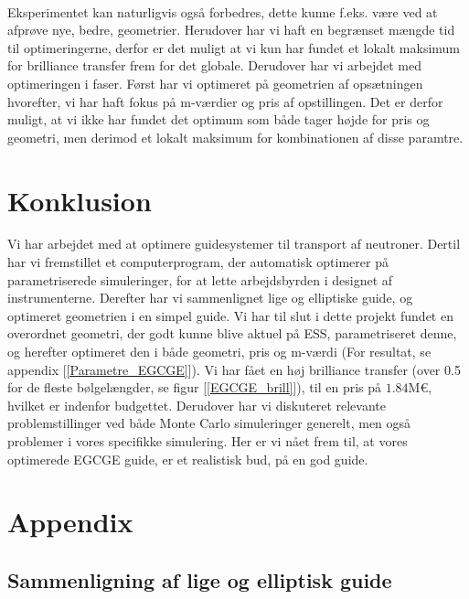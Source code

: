 \documentclass[12pt,oneside,a4paper]{article}
\begin{document}
{{{{{\\
Eksperimentet kan naturligvis også forbedres, dette kunne f.eks. være ved at afprøve nye, bedre, geometrier. Herudover har vi haft en begrænset mængde tid til optimeringerne, derfor er det muligt at vi kun har fundet et lokalt maksimum for brilliance transfer frem for det globale. Derudover har vi arbejdet med optimeringen i faser. Først har vi optimeret på geometrien af opsætningen hvorefter, vi har haft fokus på m-værdier og pris af opstillingen. Det er derfor muligt, at vi ikke har fundet det optimum som både tager højde for pris og geometri, men derimod et lokalt maksimum for kombinationen af disse paramtre.

\section{Konklusion}
Vi har arbejdet med at optimere guidesystemer til transport af neutroner. Dertil har vi fremstillet et computerprogram, der automatisk optimerer på parametriserede simuleringer, for at lette arbejdsbyrden i designet af instrumenterne. Derefter har vi sammenlignet lige og elliptiske guide, og optimeret geometrien i en simpel guide. Vi har til slut i dette projekt fundet en overordnet geometri, der godt kunne blive aktuel på ESS, parametriseret denne, og herefter optimeret den i både geometri, pris og m-værdi (For resultat, se appendix [\ref{Parametre_EGCGE}]). Vi har fået en høj brilliance transfer (over 0.5 for de fleste bølgelængder, se figur [\ref{EGCGE_brill}]), til en pris på $1.84\text{M€}$, hvilket er indenfor budgettet. Derudover har vi diskuteret relevante problemstillinger ved både Monte Carlo simuleringer generelt, men også problemer i vores specifikke simulering. Her er vi nået frem til, at vores optimerede EGCGE guide, er et realistisk bud, på en god guide.


\newpage

 

\newpage

\appendix
\section{Appendix}

\subsection{Sammenligning af lige og elliptisk guide} \label{sammenligning}

}}}}}
\end{document}
